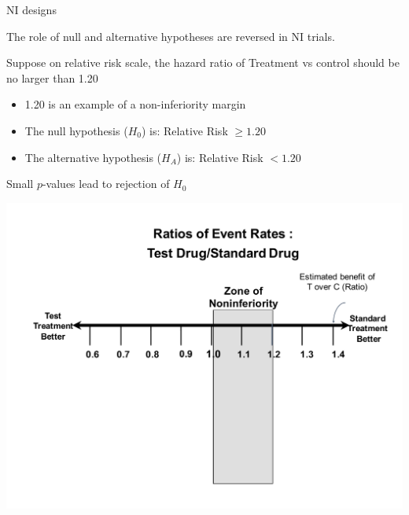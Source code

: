 \documentclass[ignorenonframetext,]{beamer}
\begin{document}
\begin{frame}{NI designs}

The role of null and alternative hypotheses are reversed in NI trials.

Suppose on relative risk scale, the hazard ratio of Treatment vs control
should be no larger than 1.20

\begin{itemize}
\item
  1.20 is an example of a non-inferiority margin
\item
  The null hypothesis (\(H_0\)) is: Relative Risk \(\ge 1.20\)
\item
  The alternative hypothesis (\(H_A\)) is: Relative Risk \(< 1.20\)
\end{itemize}

Small \(p\)-values lead to rejection of \(H_0\)

\end{frame}

\begin{frame}{}

\includegraphics{figures/ni_ci_rr_empty.pdf}

\end{frame}
\end{document}

